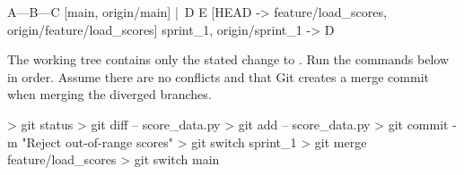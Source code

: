 \begin{gitpanel}
A---B---C [main, origin/main]
    |\
    D E [HEAD -> feature/load_scores, origin/feature/load_scores]
sprint_1, origin/sprint_1 -> D
\end{gitpanel}
{The working tree contains only the stated change to \code{score\_data.py}. Run the commands below in order. Assume there are no conflicts and that Git creates a merge commit when merging the diverged branches.}
\begin{gitpanel}
> git status
> git diff -- score_data.py
> git add -- score_data.py
> git commit -m "Reject out-of-range scores"
> git switch sprint_1
> git merge feature/load_scores
> git switch main
\end{gitpanel}

